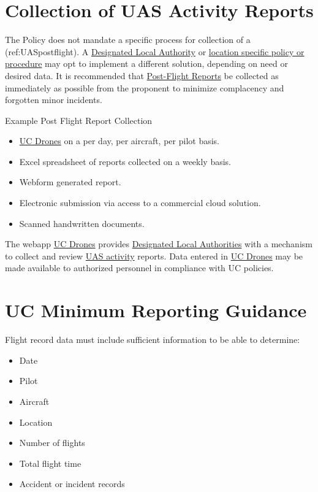 \documentclass[
]{book}
\providecommand{\tightlist}{%
  \setlength{\itemsep}{0pt}\setlength{\parskip}{0pt}}
\begin{document}
\hypertarget{s-UAS-activity-reports}{%
\section{Collection of UAS Activity Reports}\label{s-UAS-activity-reports}}

The Policy does not mandate a specific process for collection of a (ref:UASpostflight). A \protect\hyperlink{DLA}{Designated Local Authority} or \protect\hyperlink{LSP}{location specific policy or procedure} may opt to implement a different solution, depending on need or desired data. It is recommended that \protect\hyperlink{postflight}{Post-Flight Reports} be collected as immediately as possible from the proponent to minimize complacency and forgotten minor incidents.

Example Post Flight Report Collection

\begin{itemize}
\tightlist
\item
  \protect\hyperlink{UCDrones}{UC Drones} on a per day, per aircraft, per pilot basis.
\item
  Excel spreadsheet of reports collected on a weekly basis.
\item
  Webform generated report.
\item
  Electronic submission via access to a commercial cloud solution.
\item
  Scanned handwritten documents.
\end{itemize}

The webapp \protect\hyperlink{UCDrones}{UC Drones} provides \protect\hyperlink{DLA}{Designated Local Authorities} with a mechanism to collect and review \protect\hyperlink{UASactivity}{UAS activity} reports. Data entered in \protect\hyperlink{UCDrones}{UC Drones} may be made available to authorized personnel in compliance with UC policies.

\hypertarget{s-minimum-reporting}{%
\section{UC Minimum Reporting Guidance}\label{s-minimum-reporting}}

Flight record data must include sufficient information to be able to determine:

\begin{itemize}
\tightlist
\item
  Date
\item
  Pilot
\item
  Aircraft
\item
  Location
\item
  Number of flights
\item
  Total flight time
\item
  Accident or incident records
\end{itemize}
\end{document}
